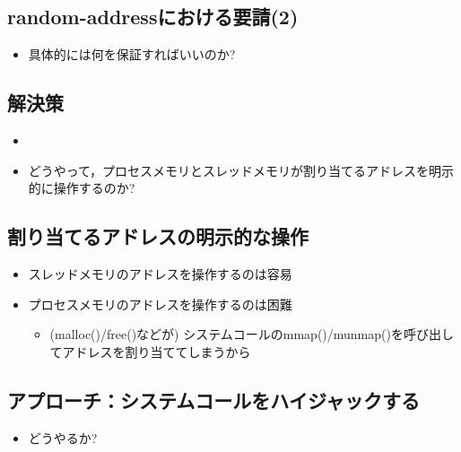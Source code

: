 \documentclass[25pt,papersize,landscape]{jsarticle}
\begin{document}
\subsection{random-addressにおける要請(2)}

\begin{itemize}
\item 具体的には何を保証すればいいのか?
\end{itemize}


\subsection{解決策}


\begin{itemize}
\item {}
\item どうやって，プロセスメモリとスレッドメモリが割り当てるアドレスを明示的に操作するのか?
\end{itemize}

\subsection{割り当てるアドレスの明示的な操作}

\begin{itemize}
\item スレッドメモリのアドレスを操作するのは容易
\item プロセスメモリのアドレスを操作するのは困難
  \begin{itemize}
  \item (malloc()/free()などが)
    システムコールのmmap()/munmap()を呼び出してアドレスを割り当ててしまうから
  \end{itemize}
\end{itemize}

\subsection{アプローチ：システムコールをハイジャックする}

\begin{itemize}
\item どうやるか?
\end{itemize}
\end{document}
